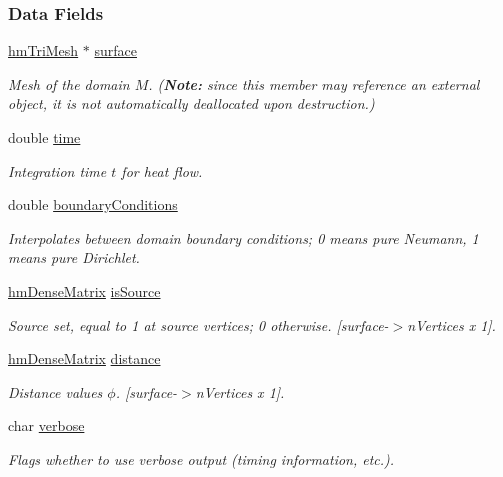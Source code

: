 \subsubsection*{Data Fields}
\begin{DoxyCompactItemize}
\item 
\hyperlink{structhm_tri_mesh}{hm\-Tri\-Mesh} $\ast$ \hyperlink{structhm_tri_distance_a09f4d4f3d7f5ded5ba8de7d34a088a38}{surface}
\begin{DoxyCompactList}\small\item\em Mesh of the domain $M$. ({\bfseries Note\-:} since this member may reference an external object, it is not automatically deallocated upon destruction.) \end{DoxyCompactList}\item 
double \hyperlink{structhm_tri_distance_ab2d5aa7fce1a14d8bddfb2c333ea9679}{time}
\begin{DoxyCompactList}\small\item\em Integration time $t$ for heat flow. \end{DoxyCompactList}\item 
double \hyperlink{structhm_tri_distance_ac4f3253165198d2d4e0cf5812cba22af}{boundary\-Conditions}
\begin{DoxyCompactList}\small\item\em Interpolates between domain boundary conditions; 0 means pure Neumann, 1 means pure Dirichlet. \end{DoxyCompactList}\item 
\hyperlink{structhm_dense_matrix}{hm\-Dense\-Matrix} \hyperlink{structhm_tri_distance_a5d82697941d1a917e535f65a6a7505c9}{is\-Source}
\begin{DoxyCompactList}\small\item\em Source set, equal to 1 at source vertices; 0 otherwise. \mbox{[}surface-\/$>$n\-Vertices x 1\mbox{]}. \end{DoxyCompactList}\item 
\hyperlink{structhm_dense_matrix}{hm\-Dense\-Matrix} \hyperlink{structhm_tri_distance_a6a9fc819eb7899fe7efd9203a89ce059}{distance}
\begin{DoxyCompactList}\small\item\em Distance values $\phi$. \mbox{[}surface-\/$>$n\-Vertices x 1\mbox{]}. \end{DoxyCompactList}\item 
char \hyperlink{structhm_tri_distance_a55cc7b4c411cfefc0601bba6b089cb71}{verbose}
\begin{DoxyCompactList}\small\item\em Flags whether to use verbose output (timing information, etc.). \end{DoxyCompactList}\end{DoxyCompactItemize}


